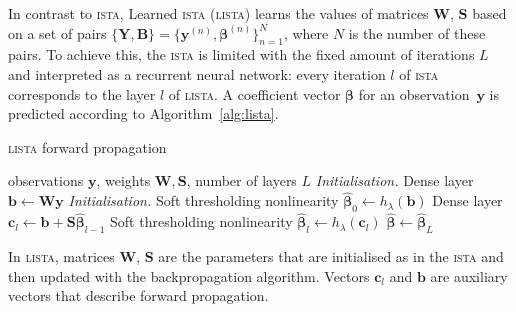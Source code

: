 \documentclass{article}
\begin{document}
In contrast to \textsc{ista}, Learned \textsc{ista} (\textsc{lista}) \cite{gregor2010learning} learns the values of matrices $\mathbf{W}$, $\mathbf{S}$ based on a set of pairs $\{\mathbf{Y}, \mathbf{B}\}=\{\mathbf{y}^{(n)}, \boldsymbol\beta^{(n)}\}_{n=1}^N$, where $N$ is the number of these pairs. To achieve this, the \textsc{ista} is limited with the fixed amount of iterations $L$ and interpreted as a recurrent neural network: every iteration $l$ of \textsc{ista} corresponds to the layer $l$ of \textsc{lista}. A coefficient vector $\boldsymbol\beta$ for an observation~$\mathbf{y}$ is predicted according to Algorithm~\ref{alg:lista}.

\begin{algorithm}[h]
  \caption{\textsc{lista} forward propagation}
  \label{alg:lista}
  \begin{algorithmic}[1]
    \REQUIRE observations $\mathbf{y}$, weights $\mathbf{W}, \mathbf{S}$, number of layers $L$
    \STATE \textit{Initialisation.} Dense layer $\mathbf{b} \gets \mathbf{W}\mathbf{y}$ \label{eq:first_layer}
    \STATE \textit{Initialisation.} Soft thresholding nonlinearity $\widehat{\boldsymbol\beta}_0 \gets h_\lambda(\mathbf{b})$ \label{eq:thr_first}
			\STATE Dense layer $\mathbf{c}_l \gets \mathbf{b} + \mathbf{S}\widehat{\boldsymbol\beta}_{l-1}$ \label{eq:l_dense_layer}
			\STATE Soft thresholding nonlinearity $\widehat{\boldsymbol\beta}_{l} \gets h_\lambda(\mathbf{c}_l)$ \label{eq:l_thr}
		\ENDFOR
		\RETURN $\widehat{\boldsymbol\beta} \gets \widehat{\boldsymbol\beta}_{L}$
  \end{algorithmic}
\end{algorithm}


In \textsc{lista}, matrices $\mathbf{W}$, $\mathbf{S}$ are the parameters that are initialised as in the \textsc{ista} and then updated with the backpropagation algorithm. Vectors $\mathbf{c}_l$ and $\mathbf{b}$ are auxiliary vectors that describe forward propagation.
\end{document}
